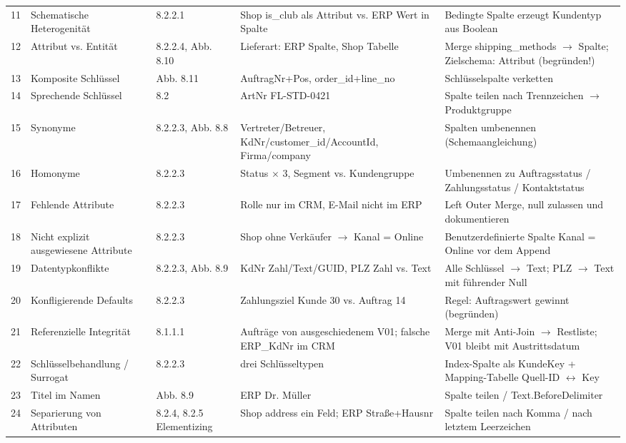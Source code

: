 \begin{landscape}
\begin{small}
\begin{longtable}{@{}r p{3.4cm} p{2.6cm} p{5.2cm} p{7.4cm}@{}}
11 & Schematische Heterogenität & 8.2.2.1 & Shop is\_club als Attribut vs. ERP Wert in Spalte & Bedingte Spalte erzeugt Kundentyp aus Boolean\\[2pt]
12 & Attribut vs. Entität & 8.2.2.4, Abb. 8.10 & Lieferart: ERP Spalte, Shop Tabelle & Merge shipping\_methods $\rightarrow$ Spalte; Zielschema: Attribut (begründen!)\\[2pt]
13 & Komposite Schlüssel & Abb. 8.11 & AuftragNr+Pos, order\_id+line\_no & Schlüsselspalte verketten\\[2pt]
14 & Sprechende Schlüssel & 8.2 & ArtNr FL-STD-0421 & Spalte teilen nach Trennzeichen $\rightarrow$ Produktgruppe\\[2pt]
15 & Synonyme & 8.2.2.3, Abb. 8.8 & Vertreter/Betreuer, KdNr/customer\_id/AccountId, Firma/company & Spalten umbenennen (Schemaangleichung)\\[2pt]
16 & Homonyme & 8.2.2.3 & Status $\times$ 3, Segment vs. Kundengruppe & Umbenennen zu Auftragsstatus / Zahlungsstatus / Kontaktstatus\\[2pt]
17 & Fehlende Attribute & 8.2.2.3 & Rolle nur im CRM, E-Mail nicht im ERP & Left Outer Merge, null zulassen und dokumentieren\\[2pt]
18 & Nicht explizit ausgewiesene Attribute & 8.2.2.3 & Shop ohne Verkäufer $\rightarrow$ Kanal = Online & Benutzerdefinierte Spalte Kanal = \grqq{}Online\grqq{} vor dem Append\\[2pt]
19 & Datentypkonflikte & 8.2.2.3, Abb. 8.9 & KdNr Zahl/Text/GUID, PLZ Zahl vs. Text & Alle Schlüssel $\rightarrow$ Text; PLZ $\rightarrow$ Text mit führender Null\\[2pt]
20 & Konfligierende Defaults & 8.2.2.3 & Zahlungsziel Kunde 30 vs. Auftrag 14 & Regel: Auftragswert gewinnt (begründen)\\[2pt]
21 & Referenzielle Integrität & 8.1.1.1 & Aufträge von ausgeschiedenem V01; falsche ERP\_KdNr im CRM & Merge mit Anti-Join $\rightarrow$ Restliste; V01 bleibt mit Austrittsdatum\\[2pt]
22 & Schlüsselbehandlung / Surrogat & 8.2.2.3 & drei Schlüsseltypen & Index-Spalte als KundeKey + Mapping-Tabelle Quell-ID $\leftrightarrow$ Key\\[2pt]
23 & Titel im Namen & Abb. 8.9 & ERP Dr. Müller & Spalte teilen / Text.BeforeDelimiter\\[2pt]
24 & Separierung von Attributen & 8.2.4, 8.2.5 Elementizing & Shop address ein Feld; ERP Straße+Hausnr & Spalte teilen nach Komma / nach letztem Leerzeichen\\[2pt]

\end{longtable}
\end{small}
\end{landscape}
